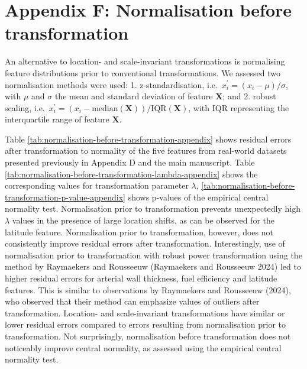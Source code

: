 \documentclass[
  a4paper,
]{article}
\begin{document}
\section{Appendix F: Normalisation before
transformation}\label{appendix-f-normalisation-before-transformation}

An alternative to location- and scale-invariant transformations is
normalising feature distributions prior to conventional transformations.
We assessed two normalisation methods were used: 1. z-standardisation,
i.e.~\(x^{\prime}_{i} = \left(x_i - \mu \right) / \sigma\), with \(\mu\)
and \(\sigma\) the mean and standard deviation of feature
\(\mathbf{X}\); and 2. robust scaling,
i.e.~\(x^{\prime}_{i} = \left(x_i - \text{median}\left(\mathbf{X}\right) \right) / \text{IQR}\left(\mathbf{X}\right)\),
with \(\text{IQR}\) representing the interquartile range of feature
\(\mathbf{X}\).

Table \ref{tab:normalisation-before-transformation-appendix} shows
residual errors after transformation to normality of the five features
from real-world datasets presented previously in Appendix D and the main
manuscript. Table
\ref{tab:normalisation-before-transformation-lambda-appendix} shows the
corresponding values for transformation parameter \(\lambda\),
\ref{tab:normalisation-before-transformation-p-value-appendix} shows
p-values of the empirical central normality test. Normalisation prior to
transformation prevents unexpectedly high \(\lambda\) values in the
presence of large location shifts, as can be observed for the latitude
feature. Normalisation prior to transformation, however, does not
consistently improve residual errors after transformation.
Interestingly, use of normalisation prior to transformation with robust
power transformation using the method by Raymaekers and Rousseeuw
(Raymaekers and Rousseeuw 2024) led to higher residual errors for
arterial wall thickness, fuel efficiency and latitude features. This is
similar to observations by Raymaekers and Rousseeuw (2024), who observed
that their method can emphasize values of outliers after transformation.
Location- and scale-invariant transformations have similar or lower
residual errors compared to errors resulting from normalisation prior to
transformation. Not surprisingly, normalisation before transformation
does not noticeably improve central normality, as assessed using the
empirical central normality test.
\end{document}
